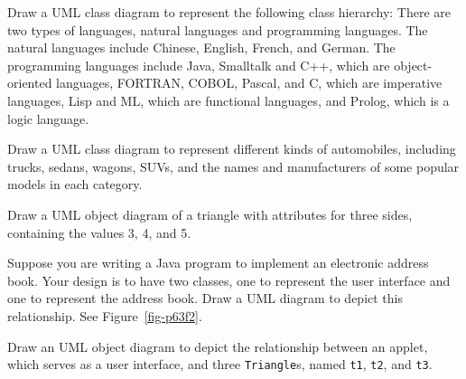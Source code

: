 \begin{EXRtwo}
\label{uml-exercises}

\item Draw a UML class diagram to represent the following
class hierarchy: There are two types of languages, natural
languages and programming languages. The natural languages
include Chinese, English, French, and German. The programming
languages include Java, Smalltalk and C++, which are object-oriented
languages, FORTRAN, COBOL, Pascal, and C, which are imperative
languages, Lisp and ML, which are functional languages, and
Prolog, which is a logic language.

\item Draw a UML class diagram to represent different kinds of
automobiles, including trucks, sedans, wagons, SUVs, and the names
and manufacturers of some popular models in each category.

\item Draw a UML object diagram of a triangle with attributes for
three sides, containing the values 3, 4, and 5.

\item Suppose you are writing a Java program to implement an electronic
address book. Your design is to have two classes, one to represent the
user interface and one to represent the address book.  Draw a UML
diagram to depict this relationship. See Figure~\ref{fig-p63f2}.

\item Draw an UML object diagram to depict the relationship between
an applet, which serves as a user interface, and three {\tt Triangle}s,
named {\tt t1}, {\tt t2}, and {\tt t3}.


\end{EXRtwo}
%

